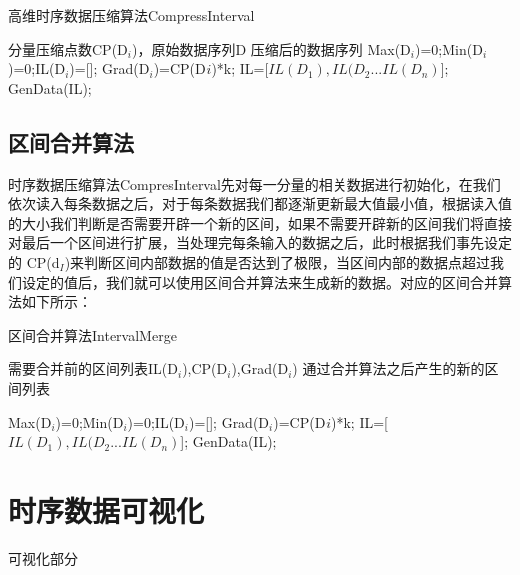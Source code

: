 \begin{algorithm}
\caption{高维时序数据压缩算法CompressInterval}
\label{alg1}
\begin{algorithmic}[1]
\REQUIRE 分量压缩点数CP(D$_{i}$)，原始数据序列D 
\ENSURE 压缩后的数据序列
\STATE Max(D$_{i}$)=0;Min(D$_{i}$)=0;IL(D$_{i}$)=[];
\STATE Grad(D$_{i}$)=CP(D$_{}i$)*k;
\ENDFOR
{}
\ENDWHILE
\STATE IL=[$ IL(D_{1}),IL(D_{2}...IL(D_{n}) $];
\RETURN GenData(IL);
\end{algorithmic}
\end{algorithm}


\subsection{区间合并算法}
\label{section 4.15}
时序数据压缩算法CompresInterval先对每一分量的相关数据进行初始化，在我们依次读入每条数据之后，对于每条数据我们都逐渐更新最大值最小值，根据读入值
的大小我们判断是否需要开辟一个新的区间，如果不需要开辟新的区间我们将直接对最后一个区间进行扩展，当处理完每条输入的数据之后，此时根据我们事先设定的
CP(d$_{I}$)来判断区间内部数据的值是否达到了极限，当区间内部的数据点超过我们设定的值后，我们就可以使用区间合并算法来生成新的数据。对应的区间合并算法如下所示：

\begin{algorithm}
\caption{区间合并算法IntervalMerge}
\label{alg2}
\begin{algorithmic}[1]
\REQUIRE 需要合并前的区间列表IL(D$_{i}$),CP(D$_{i}$),Grad(D$_{i}$) 
\ENSURE 通过合并算法之后产生的新的区间列表

\STATE Max(D$_{i}$)=0;Min(D$_{i}$)=0;IL(D$_{i}$)=[];
\STATE Grad(D$_{i}$)=CP(D$_{}i$)*k;
\ENDFOR
{}
\ENDWHILE
\STATE IL=[$ IL(D_{1}),IL(D_{2}...IL(D_{n}) $];
\RETURN GenData(IL);
\end{algorithmic}
\end{algorithm}


\section{时序数据可视化}
\label{section 4.2}

可视化部分
